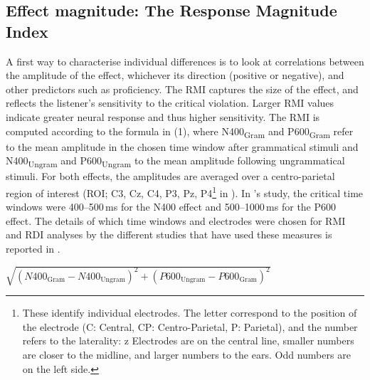 \documentclass[output=paper,colorlinks,citecolor=brown,modfonts,nonflat]{../langscibook}
\begin{document}
\subsection{Effect magnitude: The Response Magnitude Index}

A first way to characterise individual differences is to look at correlations between the amplitude of the effect, whichever its direction (positive or negative), and other predictors such as proficiency. The RMI captures the size of the effect, and reflects the listener’s sensitivity to the critical violation. Larger RMI values indicate greater neural response and thus higher sensitivity. The RMI is computed according to the formula in (1), where N400\textsubscript{Gram} and P600\textsubscript{Gram} refer to the mean amplitude in the chosen time window after grammatical stimuli and N400\textsubscript{Ungram} and P600\textsubscript{Ungram} to the mean amplitude following ungrammatical stimuli. For both effects, the amplitudes are averaged over a centro-parietal region of interest (ROI; C3, Cz, C4, P3, Pz, P4\footnote{{These identify individual electrodes. The letter correspond to the position of the electrode (C: Central, CP: Centro-Parietal, P: Parietal), and the number refers to the laterality: z Electrodes are on the central line, smaller numbers are closer to the midline, and larger numbers to the ears. Odd numbers are on the left side.}} in \citealt{TannerEtAl2014}). In \citet{TannerEtAl2014}’s study, the critical time windows were 400--500\,ms for the N400 effect and 500--1000\,ms for the P600 effect. The details of which time windows and electrodes were chosen for RMI and RDI analyses by the different studies that have used these measures is reported in . \label{bkm:Ref4399289}

\ea
$\sqrt{\left(N400_{{\text{Gram}}}-N400_{{\text{Ungram}}}\right)^2+\left(P600_{{\text{Ungram}}}-P600_{{\text{Gram}}}\right)^2}$
\z
\end{document}
